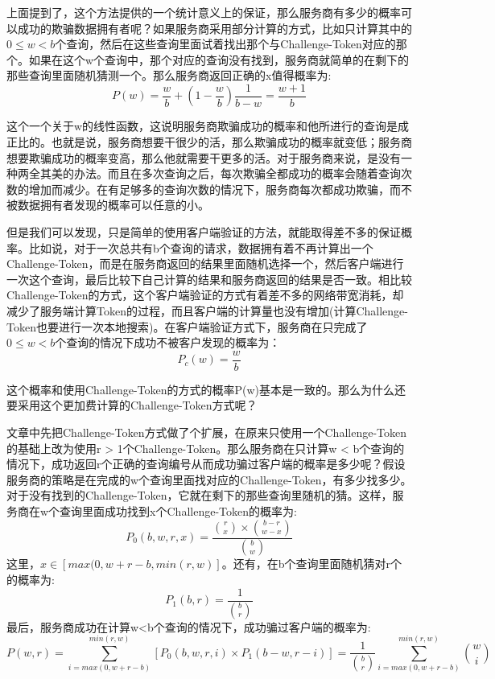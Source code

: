 上面提到了，这个方法提供的一个统计意义上的保证，那么服务商有多少的概率可以成功的欺骗数据拥有者呢？如果服务商采用部分计算的方式，比如只计算其中的$0 \le w < b$个查询，然后在这些查询里面试着找出那个与Challenge-Token对应的那个。如果在这个w个查询中，那个对应的查询没有找到，服务商就简单的在剩下的那些查询里面随机猜测一个。那么服务商返回正确的x值得概率为:
\begin{equation} P(w) = \frac{w}{b} + (1 - \frac{w}{b})\frac{1}{b-w} = \frac{w + 1}{b} \end{equation}

这个一个关于w的线性函数，这说明服务商欺骗成功的概率和他所进行的查询是成正比的。也就是说，服务商想要干很少的活，那么欺骗成功的概率就变低；服务商想要欺骗成功的概率变高，那么他就需要干更多的活。对于服务商来说，是没有一种两全其美的办法。而且在多次查询之后，每次欺骗全都成功的概率会随着查询次数的增加而减少。在有足够多的查询次数的情况下，服务商每次都成功欺骗，而不被数据拥有者发现的概率可以任意的小。

但是我们可以发现，只是简单的使用客户端验证的方法，就能取得差不多的保证概率。比如说，对于一次总共有b个查询的请求，数据拥有着不再计算出一个Challenge-Token，而是在服务商返回的结果里面随机选择一个，然后客户端进行一次这个查询，最后比较下自己计算的结果和服务商返回的结果是否一致。相比较Challenge-Token的方式，这个客户端验证的方式有着差不多的网络带宽消耗，却减少了服务端计算Token的过程，而且客户端的计算量也没有增加(计算Challenge-Token也要进行一次本地搜索)。在客户端验证方式下，服务商在只完成了$0 \le w < b$个查询的情况下成功不被客户发现的概率为：
\begin{equation} P_c(w) = \frac{w}{b} \end{equation}

这个概率和使用Challenge-Token的方式的概率P(w)基本是一致的。那么为什么还要采用这个更加费计算的Challenge-Token方式呢？

文章中先把Challenge-Token方式做了个扩展，在原来只使用一个Challenge-Token的基础上改为使用r > 1个Challenge-Token。那么服务商在只计算w < b个查询的情况下，成功返回r个正确的查询编号从而成功骗过客户端的概率是多少呢？假设服务商的策略是在完成的w个查询里面找对应的Challenge-Token，有多少找多少。对于没有找到的Challenge-Token，它就在剩下的那些查询里随机的猜。这样，服务商在w个查询里面成功找到x个Challenge-Token的概率为:
\begin{equation} P_0(b, w, r, x) = \frac{\binom{r}{x} \times \binom{b-r}{w-x}}{\binom{b}{w}} \end{equation}
这里，$x \in [max(0, w+r-b, min(r,w)]$。还有，在b个查询里面随机猜对r个的概率为:
\begin{equation} P_1(b,r) = \frac{1}{\binom{b}{r}} \end{equation}
最后，服务商成功在计算w<b个查询的情况下，成功骗过客户端的概率为:
\begin{equation} P(w,r) = \sum_{i=max(0,w+r-b)}^{min(r,w)} [P_0(b,w,r,i) \times P_1(b-w,r-i)] = \frac{1}{\binom{b}{r}}\sum_{i=max(0,w+r-b)}^{min(r,w)}\binom{w}{i} \end{equation}


